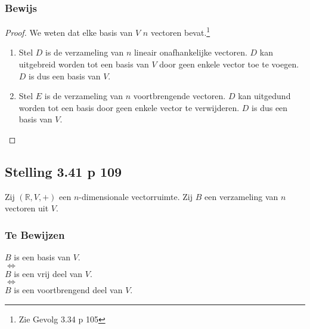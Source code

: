 \documentclass[lineaire_algebra_oplossingen.tex]{subfiles}
\begin{document}
\subsubsection*{Bewijs}
\begin{proof}
We weten dat elke basis van $V$ $n$ vectoren bevat.\footnote{Zie Gevolg 3.34 p 105}
\begin{enumerate}
\item
Stel $D$ is de verzameling van $n$ lineair onafhankelijke vectoren. $D$ kan uitgebreid worden tot een basis van $V$ door geen enkele vector toe te voegen. $D$ is dus een basis van $V$.
\item
Stel $E$ is de verzameling van $n$ voortbrengende vectoren. $D$ kan uitgedund worden tot een basis door geen enkele vector te verwijderen. $D$ is dus een basis van $V$.
\end{enumerate}
\end{proof}


\subsection{Stelling 3.41 p 109}
\label{3.41}
Zij $(\mathbb{R},V,+)$ een $n$-dimensionale vectorruimte. Zij $B$ een verzameling van $n$ vectoren uit $V$.

\subsubsection*{Te Bewijzen}
\begin{center}
$B$ is een basis van $V$.\\$\Leftrightarrow$\\
$B$ is een vrij deel van $V$.\\$\Leftrightarrow$\\
$B$ is een voortbrengend deel van $V$.
\end{center}
\end{document}
